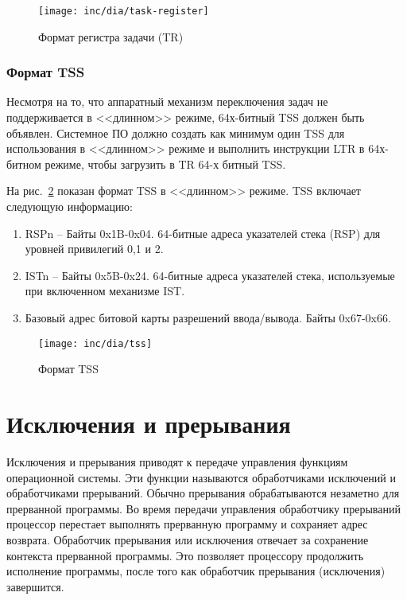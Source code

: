 \begin{figure}
  \centering
  \texttt{[image: inc/dia/task-register]}
  \caption{Формат регистра задачи (TR)}
  \label{fig:task_register}
\end{figure}

\subsubsection*{Формат TSS}
Несмотря на то, что аппаратный механизм переключения задач не поддерживается в
<<длинном>> режиме, 64х-битный TSS должен быть объявлен. Системное ПО должно
создать как минимум один TSS для использования в <<длинном>> режиме и
выполнить инструкции LTR в 64х-битном режиме, чтобы загрузить в TR 64-х битный
TSS.

На рис.~\ref{fig:tss} показан формат TSS в <<длинном>> режиме. TSS включает
следующую информацию:
\begin{enumerate}
\item RSPn -- Байты 0x1B-0x04. 64-битные адреса указателей стека (RSP) для
	уровней привилегий 0,1 и 2.
\item ISTn -- Байты 0x5B-0x24. 64-битные адреса указателей стека, используемые
	при включенном механизме IST.
\item Базовый адрес битовой карты разрешений ввода/вывода. Байты 0x67-0x66.
\end{enumerate}

\begin{figure}
  \centering
  \texttt{[image: inc/dia/tss]}
  \caption{Формат TSS}
  \label{fig:tss}
\end{figure}



\section{Исключения и прерывания}
\label{sec:exceptions_and_interrupts}

Исключения и прерывания приводят к передаче управления функциям операционной
системы. Эти функции называются обработчиками исключений и обработчиками
прерываний. Обычно прерывания обрабатываются незаметно для прерванной
программы. Во время передачи управления обработчику прерываний процессор
перестает выполнять прерванную программу и сохраняет адрес возврата.
Обработчик прерывания или исключения отвечает за сохранение контекста
прерванной программы. Это позволяет процессору продолжить исполнение
программы, после того как обработчик прерывания (исключения) завершится.

